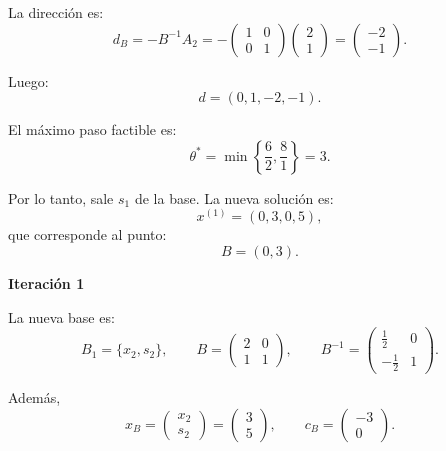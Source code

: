 \begin{enumerate}
La dirección es:
\begin{equation}
d_B=-B^{-1}A_2
=
-
\begin{pmatrix}
1 & 0\\
0 & 1
\end{pmatrix}
\begin{pmatrix}
2\\
1
\end{pmatrix}
=
\begin{pmatrix}
-2\\
-1
\end{pmatrix}.
\end{equation}

Luego:
\begin{equation}
d=(0,1,-2,-1).
\end{equation}

El máximo paso factible es:
\begin{equation}
\theta^*
=
\min\left\{
\frac{6}{2},
\frac{8}{1}
\right\}
=
3.
\end{equation}

Por lo tanto, sale $s_1$ de la base. La nueva solución es:
\begin{equation}
x^{(1)}
=
(0,3,0,5),
\end{equation}
que corresponde al punto:
\begin{equation}
B=(0,3).
\end{equation}

\textbf{Iteración 1}

La nueva base es:
\begin{equation}
B_1=\{x_2,s_2\},
\qquad
B=
\begin{pmatrix}
2 & 0\\
1 & 1
\end{pmatrix},
\qquad
B^{-1}
=
\begin{pmatrix}
\frac{1}{2} & 0\\
-\frac{1}{2} & 1
\end{pmatrix}.
\end{equation}

Además,
\begin{equation}
x_B=
\begin{pmatrix}
x_2\\
s_2
\end{pmatrix}
=
\begin{pmatrix}
3\\
5
\end{pmatrix},
\qquad
c_B=
\begin{pmatrix}
-3\\
0
\end{pmatrix}.
\end{equation}


\end{enumerate}
